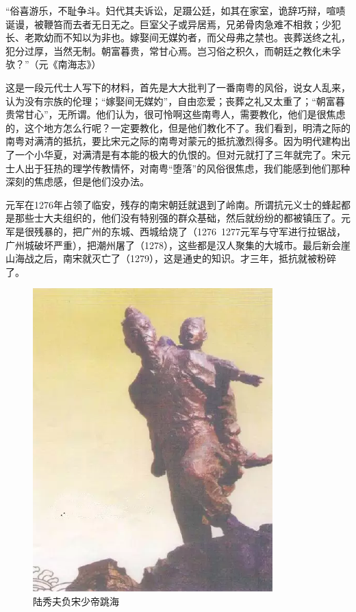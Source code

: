 “俗喜游乐，不耻争斗。妇代其夫诉讼，足蹑公廷，如其在家室，诡辞巧辩，喧啧诞谩，被鞭笞而去者无日无之。巨室父子或异居焉，兄弟骨肉急难不相救；少犯长、老欺幼而不知以为非也。嫁娶间无媒妁者，而父母弗之禁也。丧葬送终之礼，犯分过厚，当然无制。朝富暮贵，常甘心焉。岂习俗之积久，而朝廷之教化未孚欤？”（元《南海志》）

这是一段元代士人写下的材料，首先是大大批判了一番南粤的风俗，说女人乱来，认为没有宗族的伦理；“嫁娶间无媒妁”，自由恋爱；丧葬之礼又太重了；“朝富暮贵常甘心”，无所谓。他们认为，很可怜啊这些南粤人，需要教化，他们是很焦虑的，这个地方怎么行呢？一定要教化，但是他们教化不了。我们看到，明清之际的南粤对满清的抵抗，要比宋元之际的南粤对蒙元的抵抗激烈得多。因为明代建构出了一个小华夏，对满清是有本能的极大的仇恨的。但对元就打了三年就完了。宋元士人出于狂热的理学传教情怀，对南粤“堕落”的风俗很焦虑，我们能感到他们那种深刻的焦虑感，但是他们没办法。

元军在1276年占领了临安，残存的南宋朝廷就退到了岭南。所谓抗元义士的蜂起都是那些士大夫组织的，他们没有特别强的群众基础，然后就纷纷的都被镇压了。元军是很残暴的，把广州的东城、西城给烧了（1276~1277元军与守军进行拉锯战，广州城破坏严重），把潮州屠了（1278），这些都是汉人聚集的大城市。最后新会崖山海战之后，南宋就灭亡了（1279），这是通史的知识。才三年，抵抗就被粉碎了。

\begin{figure}
	\centering
	\includegraphics[width=\textwidth]{images/image-41}
	\caption{陆秀夫负宋少帝跳海}
\end{figure}


